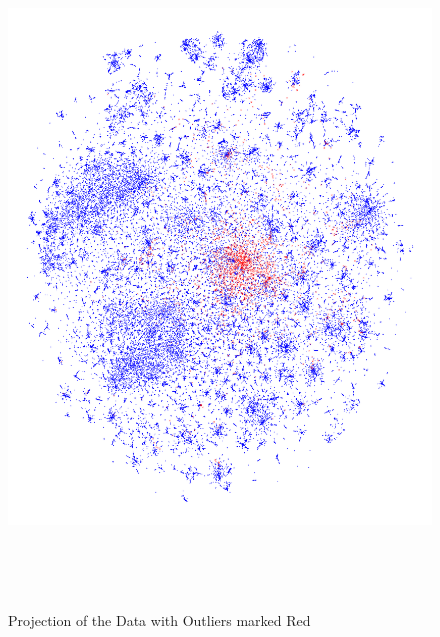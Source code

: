 \begin{figure}[h!]
	\centering
	\includegraphics[height=18cm]{Bilder/models/outliers.pdf}
	\caption{Projection of the Data with Outliers marked Red }
	\label{fig:dbscan-outliers}
\end{figure}
